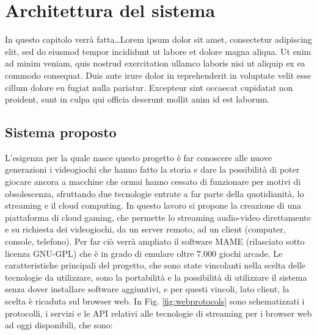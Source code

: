 %
%

\chapter{Architettura del sistema}
In questo capitolo verrà fatta\dots Lorem ipsum dolor sit amet, consectetur adipiscing elit, sed do eiusmod tempor incididunt ut labore et dolore magna aliqua. Ut enim ad minim veniam, quis nostrud exercitation ullamco laboris nisi ut aliquip ex ea commodo consequat. Duis aute irure dolor in reprehenderit in voluptate velit esse cillum dolore eu fugiat nulla pariatur. Excepteur sint occaecat cupidatat non proident, sunt in culpa qui officia deserunt mollit anim id est laborum.



\section{Sistema proposto}
L'esigenza per la quale nasce questo progetto è far conoscere alle nuove generazioni i videogiochi che hanno fatto la storia e dare la possibilità di poter giocare ancora a macchine che ormai hanno cessato di funzionare per motivi di obsolescenza, sfruttando due tecnologie entrate a far parte della quotidianità, lo streaming e il cloud computing. In questo lavoro si propone la creazione di una piattaforma di cloud gaming, che permette lo streaming audio-video direttamente e su richiesta dei videogiochi, da un server remoto, ad un client (computer, console, telefono). Per far ciò verrà ampliato il software MAME (rilasciato sotto licenza GNU-GPL) che è in grado di emulare oltre 7.000 giochi arcade. Le caratteristiche principali del progetto, che sono state vincolanti nella scelta delle tecnologie da utilizzare, sono la portabilità e la possibilità di utilizzare il sistema senza dover installare software aggiuntivi, e per questi vincoli, lato client, la scelta è ricaduta sul browser web. In Fig. \ref{fig:webprotocols} sono schematizzati i protocolli, i servizi e le API relativi alle tecnologie di streaming per i browser web ad oggi disponibili\cite{Audio_and_video_delivery}, che sono:


